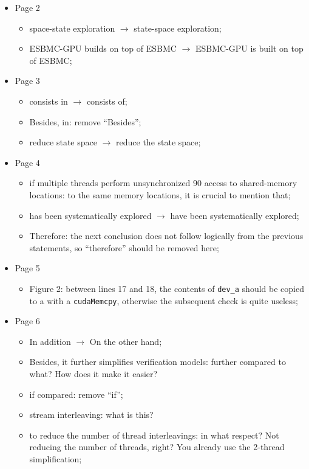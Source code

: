 \documentclass[12pt]{article}
\begin{document}
\begin{itemize}
\item Page 2
  \begin{itemize}
  \item space-state exploration $\rightarrow$ state-space exploration;
  \item ESBMC-GPU builds on top of ESBMC $\rightarrow$ ESBMC-GPU is built on top of ESBMC;
  \end{itemize}
\item Page 3
  \begin{itemize}
  \item consists in $\rightarrow$ consists of;
  \item Besides, in: remove ``Besides'';
  \item reduce state space $\rightarrow$ reduce the state space;
  \end{itemize}
\item Page 4
  \begin{itemize}
  \item if multiple threads perform unsynchronized 90 access to shared-memory locations: to the same memory locations, it is crucial to mention that;
  \item has been systematically explored $\rightarrow$ have been systematically explored;
  \item Therefore: the next conclusion does not follow logically from the previous statements, so ``therefore'' should be removed here;
  \end{itemize}
\item Page 5
  \begin{itemize}
  \item Figure 2: between lines 17 and 18, the contents of {\tt dev\_a} should be copied to a with a {\tt cudaMemcpy}, otherwise the subsequent check is quite useless;
  \end{itemize}
\item Page 6
  \begin{itemize}
  \item In addition $\rightarrow$ On the other hand;
  \item Besides, it further simplifies verification models: further compared to what? How does it make it easier?
  \item if compared: remove ``if'';
  \item stream interleaving: what is this?
  \item  to reduce the number of thread interleavings: in what respect? Not reducing the number of threads, right? You already use the 2-thread simplification;
  \end{itemize}
\end{itemize}
\end{document}
